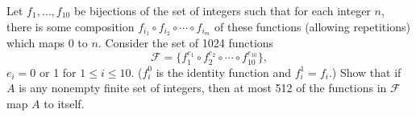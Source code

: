 Let $f_1, \dots, f_{10}$ be bijections of the set of integers such that for
each integer $n$, there is some composition $f_{i_1} \circ f_{i_2}
\circ \cdots \circ f_{i_m}$ of these functions (allowing repetitions)
which maps 0 to $n$. Consider the set of 1024 functions
\[
\mathcal{F} = \{f_1^{e_1} \circ f_2^{e_2} \circ \cdots \circ f_{10}^{e_{10}}\},
\]
$e_i = 0$ or 1 for $1 \leq i \leq 10$. ($f_i^0$ is the identity function
and $f_i^1 = f_i$.) Show that if $A$ is any nonempty finite set of
integers, then at most 512 of the functions in $\mathcal{F}$ map $A$ to
itself.
